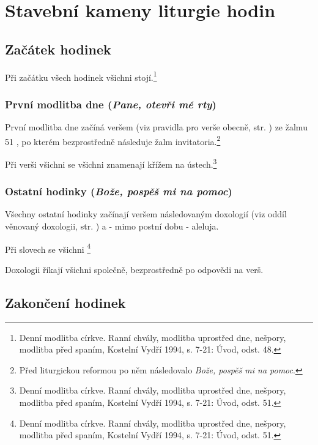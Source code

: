 \section{Stavební kameny liturgie hodin}

\subsection{Začátek hodinek}
\label{sec:zacatek}

Při začátku všech hodinek všichni stojí.\footnote{Denní modlitba církve. Ranní chvály, modlitba uprostřed dne, nešpory, modlitba před spaním, Kostelní Vydří 1994, s. 7-21: Úvod, odst. 48.}

\subsubsection{První modlitba dne (\emph{Pane, otevři mé rty})}

První modlitba dne začíná veršem (viz pravidla pro verše obecně,
str. \pageref{sec:vers}) ze žalmu 51
, po kterém
bezprostředně následuje žalm invitatoria.\footnote{Před liturgickou
reformou po něm následovalo \emph{Bože, pospěš mi na pomoc}.}

Při verši všichni se všichni znamenají křížem na ústech.\footnote{Denní modlitba církve. Ranní chvály, modlitba uprostřed dne, nešpory, modlitba před spaním, Kostelní Vydří 1994, s. 7-21: Úvod, odst. 51.}

\subsubsection{Ostatní hodinky (\emph{Bože, pospěš mi na pomoc})}

Všechny ostatní hodinky začínají veršem 
následovaným doxologií (viz oddíl věnovaný doxologii, str. \pageref{sec:doxologie}) 
a - mimo postní dobu - aleluja.

Při slovech  se všichni \footnote{Denní modlitba církve. Ranní chvály, modlitba uprostřed dne, nešpory, modlitba před spaním, Kostelní Vydří 1994, s. 7-21: Úvod, odst. 51.}

Doxologii říkají všichni společně, bezprostředně po odpovědi na verš.

\subsection{Zakončení hodinek}
\label{sec:zakonceni}
